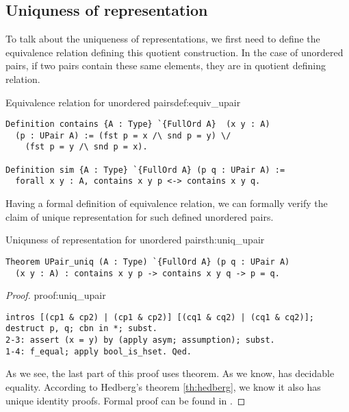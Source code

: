 \subsection{Uniquness of representation}
To talk about the uniqueness of representations, we first need to define the equivalence relation defining this quotient construction. In the case of unordered pairs, if two pairs contain these same elements, they are in quotient defining relation.
\begin{defi}{Equivalence relation for unordered pairs}{def:equiv_upair}
\begin{verbatim}
Definition contains {A : Type} `{FullOrd A}  (x y : A)
  (p : UPair A) := (fst p = x /\ snd p = y) \/ 
    (fst p = y /\ snd p = x).

Definition sim {A : Type} `{FullOrd A} (p q : UPair A) :=
  forall x y : A, contains x y p <-> contains x y q. 
\end{verbatim}
\end{defi}
Having a formal definition of equivalence relation, we can formally verify the claim of unique representation for such defined unordered pairs.
\begin{theo}{Uniquness of representation for unordered pairs}{th:uniq_upair}
\begin{verbatim}
Theorem UPair_uniq (A : Type) `{FullOrd A} (p q : UPair A) 
  (x y : A) : contains x y p -> contains x y q -> p = q.
\end{verbatim}
\end{theo}
\begin{proof}{}{proof:uniq_upair}
\begin{verbatim}
intros [(cp1 & cp2) | (cp1 & cp2)] [(cq1 & cq2) | (cq1 & cq2)];
destruct p, q; cbn in *; subst.
2-3: assert (x = y) by (apply asym; assumption); subst.
1-4: f_equal; apply bool_is_hset. Qed.
\end{verbatim}
As we see, the last part of this proof uses  theorem. As we know,  has decidable equality. According to Hedberg's theorem \ref{th:hedberg}, we know it also has unique identity proofs. Formal proof can be found in .
\end{proof}
